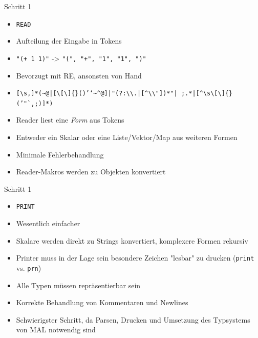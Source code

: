 \documentclass[presentation]{beamer}
\begin{document}
\begin{frame}[fragile,label=sec-3-8]{Schritt 1}
 \begin{itemize}
\item \texttt{READ}
\item Aufteilung der Eingabe in Tokens
\item \texttt{"(+ 1 1)"} -> \texttt{"(", "+", "1", "1", ")"}
\item Bevorzugt mit RE, ansonsten von Hand
\item \texttt{[\textbackslash{}s,]*(\textasciitilde{}@|[\textbackslash{}[\textbackslash{}]\{\}()'`\textasciitilde{}\textasciicircum{}@]|"(?:\textbackslash{}\textbackslash{}.|[\textasciicircum{}\textbackslash{}\textbackslash{}"])*"| ;.*|[\textasciicircum{}\textbackslash{}s\textbackslash{}[\textbackslash{}]\{\}('"`,;)]*)}
\item Reader liest eine \emph{Form} aus Tokens
\item Entweder ein Skalar oder eine Liste/Vektor/Map aus weiteren Formen
\item Minimale Fehlerbehandlung
\item Reader-Makros werden zu Objekten konvertiert
\end{itemize}
\end{frame}

\begin{frame}[fragile,label=sec-3-9]{Schritt 1}
 \begin{itemize}
\item \texttt{PRINT}
\item Wesentlich einfacher
\item Skalare werden direkt zu Strings konvertiert, komplexere Formen
rekursiv
\item Printer muss in der Lage sein besondere Zeichen "lesbar" zu drucken
(\texttt{print} vs. \texttt{prn})
\item Alle Typen müssen repräsentierbar sein
\item Korrekte Behandlung von Kommentaren und Newlines
\item Schwierigster Schritt, da Parsen, Drucken und Umsetzung des
Typsystems von MAL notwendig sind
\end{itemize}
\end{frame}
\end{document}
